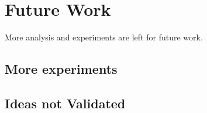 \section{Future Work}
More analysis and experiments are left for future work.

\subsection{More experiments}

\subsection{Ideas not Validated}
